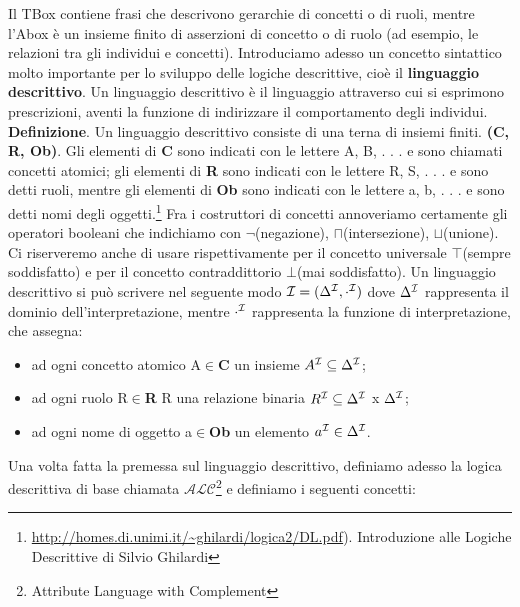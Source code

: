 \documentclass[a4paper,11pt]{article}
\newcommand{\alc}{%
   \ensuremath{\mathcal{ALC}}\xspace}
\newcommand{\I}{%
        \ensuremath{\mathcal{I}}\xspace}
\begin{document}
Il TBox contiene frasi che descrivono gerarchie di concetti o di ruoli, mentre l'Abox è un insieme finito di asserzioni di concetto o di ruolo (ad esempio, le relazioni tra gli individui e concetti).
Introduciamo adesso un concetto sintattico molto importante per lo sviluppo delle logiche descrittive, cioè il \textbf{linguaggio descrittivo}.
Un linguaggio descrittivo è il linguaggio attraverso cui si esprimono prescrizioni, aventi la funzione di indirizzare il comportamento degli individui. \newline
\textbf{Definizione}. \newline Un linguaggio descrittivo consiste di una terna di insiemi finiti. \textbf{(C, R, Ob)}. Gli elementi di \textbf{C} sono indicati con le lettere A, B, . . . e sono chiamati concetti atomici; gli elementi di \textbf{R} sono indicati con le lettere R, S, . . . e sono detti
ruoli, mentre gli elementi di \textbf{Ob} sono indicati con le lettere a, b, . . . e sono detti nomi degli oggetti.\footnote{ \url{http://homes.di.unimi.it/~ghilardi/logica2/DL.pdf}). Introduzione alle Logiche Descrittive di Silvio Ghilardi}\newline
Fra i costruttori di concetti annoveriamo certamente gli operatori booleani che indichiamo con $\neg$(negazione), $\sqcap$(intersezione), $\sqcup$(unione). \newline Ci riserveremo anche di usare rispettivamente per il concetto universale $\top$(sempre soddisfatto) e  per il concetto contraddittorio $\bot$(mai soddisfatto).\newline
Un linguaggio descrittivo si può scrivere nel seguente modo $\I = (\Delta^\I,\cdot^\I)$ dove $\Delta^\I$ rappresenta il dominio dell'interpretazione, 
mentre $\cdot^\I$ rappresenta la funzione di interpretazione, che assegna:
\begin{itemize}
	\item ad ogni concetto atomico A$\in$\textbf{C} un insieme  $A^{\I}\subseteq \Delta^\I$;
	\item ad ogni ruolo R$\in$\textbf{R} R una relazione binaria $R^{\I}\subseteq 	\Delta^{\I}$ x $\Delta^{\I} $;
	\item ad ogni nome di oggetto a$\in$\textbf{Ob} un elemento $a^{\I}\in \Delta^\I$.
\end{itemize}  Una volta fatta la premessa sul linguaggio descrittivo, definiamo adesso la logica descrittiva di base chiamata $\alc$\footnote{Attribute Language with Complement} e definiamo i seguenti concetti:
\end{document}
